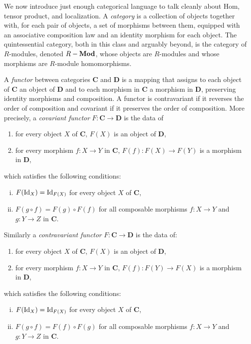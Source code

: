 \documentclass[12pt,reqno]{amsart}
\begin{document}
We now introduce just enough categorical language to talk cleanly about Hom, tensor product, and localization. A \emph{category} is a collection of objects together with, for each pair of objects, a set of morphisms between them, equipped with an associative composition law and an identity morphism for each object. The quintessential category, both in this class and arguably beyond, is the category of $R$-modules, denoted $R-\operatorname{\textbf{Mod}}$, whose objects are $R$-modules and whose morphisms are $R$-module homomorphisms. 

A \emph{functor} between categories $\textbf{C}$ and $\textbf{D}$ is a mapping that assigns to each object of $\textbf{C}$ an object of $\textbf{D}$ and to each morphism in $\textbf{C}$ a morphism in $\textbf{D}$, preserving identity morphisms and composition. A functor is contravariant if it reverses the order of composition and covariant if it preserves the order of composition. More precisely, a \emph{covariant functor} $F: \textbf{C} \to \textbf{D}$ is the data of
\begin{enumerate}
\item for every object $X$ of $\textbf{C}$, $F(X)$ is an object of $\textbf{D}$,
\item for every morphism $f: X \to Y$ in $\textbf{C}$, $F(f): F(X) \to F(Y)$ is a morphism in $\textbf{D}$,
\end{enumerate}
which satisfies the following conditions:
\begin{enumerate}[(i)]
\item $F(\operatorname{Id}_X) = \operatorname{Id}_{F(X)}$ for every object $X$ of $\textbf{C}$,
\item $F(g \circ f) = F(g) \circ F(f)$ for all composable morphisms $f: X \to Y$ and $g: Y \to Z$ in $\textbf{C}$.
\end{enumerate}
Similarly a \emph{contravariant functor} $F:\textbf{C} \to \textbf{D}$ is the data of:
\begin{enumerate}
\item for every object $X$ of $\textbf{C}$, $F(X)$ is an object of $\textbf{D}$,
\item for every morphism $f: X \to Y$ in $\textbf{C}$, $F(f): F(Y) \to F(X)$ is a morphism in $\textbf{D}$,
\end{enumerate}
which satisfies the following conditions:
\begin{enumerate}[(i)]
\item $F(\operatorname{Id}_X) = \operatorname{Id}_{F(X)}$ for every object $X$ of $\textbf{C}$,
\item $F(g \circ f) = F(f) \circ F(g)$ for all composable morphisms $f: X \to Y$ and $g: Y \to Z$ in $\textbf{C}$.
\end{enumerate}
\end{document}
